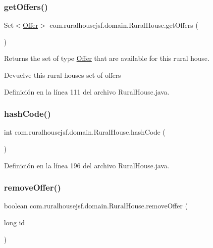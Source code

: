 \subsubsection{\texorpdfstring{getOffers()}{getOffers()}}
{\footnotesize\ttfamily Set$<$\mbox{\hyperlink{classcom_1_1ruralhousejsf_1_1domain_1_1_offer}{Offer}}$>$ com.\+ruralhousejsf.\+domain.\+Rural\+House.\+get\+Offers (\begin{DoxyParamCaption}{ }\end{DoxyParamCaption})}



Returns the set of type \mbox{\hyperlink{classcom_1_1ruralhousejsf_1_1domain_1_1_offer}{Offer}} that are available for this rural house. 

\begin{DoxyReturn}{Devuelve}
this rural houses set of offers 
\end{DoxyReturn}


Definición en la línea 111 del archivo Rural\+House.\+java.

\mbox{\label{classcom_1_1ruralhousejsf_1_1domain_1_1_rural_house_a12fcb2ec3f802b71b5a1357622255b86}} 
\subsubsection{\texorpdfstring{hashCode()}{hashCode()}}
{\footnotesize\ttfamily int com.\+ruralhousejsf.\+domain.\+Rural\+House.\+hash\+Code (\begin{DoxyParamCaption}{ }\end{DoxyParamCaption})}



Definición en la línea 196 del archivo Rural\+House.\+java.

\mbox{\label{classcom_1_1ruralhousejsf_1_1domain_1_1_rural_house_ab6443a7d5fdef35c6a04110d497ddb16}} 
\subsubsection{\texorpdfstring{removeOffer()}{removeOffer()}\hspace{0.1cm}{\footnotesize\ttfamily [1/2]}}
{\footnotesize\ttfamily boolean com.\+ruralhousejsf.\+domain.\+Rural\+House.\+remove\+Offer (\begin{DoxyParamCaption}\item[{long}]{id }\end{DoxyParamCaption})}



